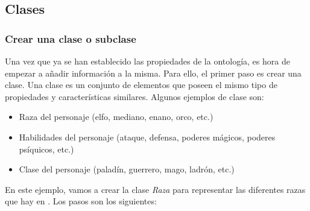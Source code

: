 \subsection{Clases}
\subsubsection{Crear una clase o subclase} \label{CreateSubclass}
Una vez que ya se han establecido las propiedades de la ontología, es hora de empezar a añadir información a la misma.
Para ello, el primer paso es crear una clase. Una clase es un conjunto de elementos que poseen el mismo tipo de propiedades 
y características similares. Algunos ejemplos de clase son:
\begin{itemize}
    \item Raza del personaje (elfo, mediano, enano, orco, etc.)
    \item Habilidades del personaje (ataque, defensa, poderes mágicos, poderes psíquicos, etc.)
    \item Clase del personaje (paladín, guerrero, mago, ladrón, etc.)
\end{itemize}

En este ejemplo, vamos a crear la clase \textit{Raza} para representar las diferentes razas que hay en \anima.
Los pasos son los siguientes: 

